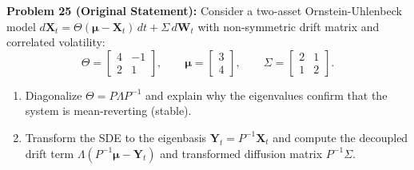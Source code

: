 \documentclass[11pt, letterpaper]{article}
\theoremstyle{definition}
\theoremstyle{remark}
\begin{document}
\vspace{0.8em}
\textbf{Problem 25 (Original Statement):}
Consider a two-asset Ornstein-Uhlenbeck model $d\mathbf{X}_{t} = \Theta(\boldsymbol{\mu} - \mathbf{X}_{t})\,dt + \Sigma\,d\mathbf{W}_{t}$ with non-symmetric drift matrix and correlated volatility:
\[
\Theta = \begin{bmatrix} 4 & -1 \\ 2 & 1 \end{bmatrix}, \qquad \boldsymbol{\mu} = \begin{bmatrix} 3 \\ 4 \end{bmatrix}, \qquad \Sigma = \begin{bmatrix} 2 & 1 \\ 1 & 2 \end{bmatrix}.
\]
\begin{enumerate}[label=(\alph*)]
    \item Diagonalize $\Theta = P\Lambda P^{-1}$ and explain why the eigenvalues confirm that the system is mean-reverting (stable).
    \item Transform the SDE to the eigenbasis $\mathbf{Y}_{t} = P^{-1}\mathbf{X}_{t}$ and compute the decoupled drift term $\Lambda(P^{-1}\boldsymbol{\mu} - \mathbf{Y}_{t})$ and transformed diffusion matrix $P^{-1}\Sigma$.
\end{enumerate}
\end{document}
